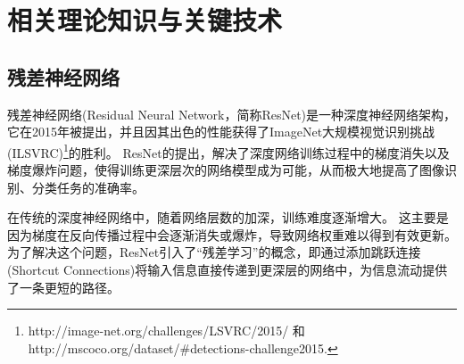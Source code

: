 \chapter{相关理论知识与关键技术}
\label{cha:basic-knowledge}




\section{残差神经网络}
残差神经网络(Residual Neural Network，简称ResNet)是一种深度神经网络架构，它在2015年被提出，并且因其出色的性能获得了ImageNet大规模视觉识别挑战(ILSVRC)\footnote{http://image-net.org/challenges/LSVRC/2015/ 和 http://mscoco.org/dataset/\#detections-challenge2015.}的胜利\cite{he2016deep}。
ResNet的提出，解决了深度网络训练过程中的梯度消失以及梯度爆炸问题，使得训练更深层次的网络模型成为可能，从而极大地提高了图像识别、分类任务的准确率。

在传统的深度神经网络中，随着网络层数的加深，训练难度逐渐增大。
这主要是因为梯度在反向传播过程中会逐渐消失或爆炸，导致网络权重难以得到有效更新。
为了解决这个问题，ResNet引入了“残差学习”的概念，即通过添加跳跃连接(Shortcut Connections)将输入信息直接传递到更深层的网络中，为信息流动提供了一条更短的路径。

